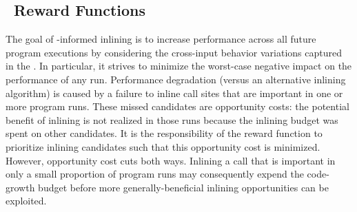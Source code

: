 \subsection{\FDI\ Reward Functions}
\label{eval:rewards}

The goal of \CP-informed inlining is to increase performance across
all future program executions by considering the cross-input behavior
variations captured in the \CProf.  In particular, it strives to
minimize the worst-case negative impact on the performance of any
run. Performance degradation (versus an alternative inlining
algorithm) is caused by a failure to inline call sites that are
important in one or more program runs.  These missed candidates are
opportunity costs: the potential benefit of inlining is not realized
in those runs because the inlining budget was spent on other
candidates.  It is the responsibility of the reward function to
prioritize inlining candidates such that this opportunity cost is
minimized.  However, opportunity cost cuts both ways.  Inlining a call
that is important in only a small proportion of program runs may
consequently expend the code-growth budget before more
generally-beneficial inlining opportunities can be exploited.

%
%
%

